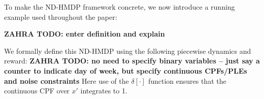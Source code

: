 To make the ND-HMDP framework concrete, we now introduce a running example used
throughout the paper:
\begin{example*}
{\bf ZAHRA TODO: enter definition and explain}
\end{example*}
We formally define this ND-HMDP using the following piecewise dynamics and reward:
{\bf ZAHRA TODO: no need to specify binary variables -- just say a counter to indicate
day of week, but specify continuous CPFs/PLEs and noise constraints}
Here use of the $\delta[\cdot]$ function ensures that the continuous CPF over $x'$ integrates to 1.

